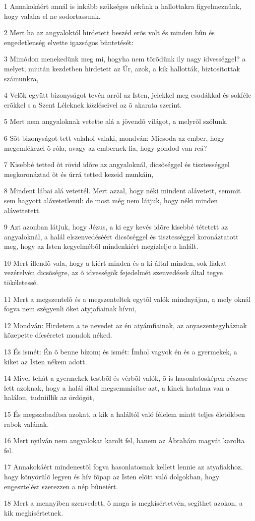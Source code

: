 \par 1 Annakokáért annál is inkább szükséges nékünk a hallottakra figyelmeznünk, hogy valaha el ne sodortassunk.
\par 2 Mert ha az angyaloktól hirdetett beszéd erõs volt és minden bûn és engedetlenség elvette  igazságos büntetését:
\par 3 Mimódon menekedünk meg mi, hogyha nem törõdünk ily nagy idvességgel? a melyet, miután kezdetben hirdetett az Úr, azok, a kik hallották, biztosítottak számunkra,
\par 4 Velök együtt bizonyságot tevén arról az Isten, jelekkel meg csodákkal és sokféle erõkkel s a Szent Léleknek közléseivel  az õ akarata szerint.
\par 5 Mert nem angyaloknak vetette alá a jövendõ világot, a melyrõl szólunk.
\par 6 Sõt bizonyságot tett valahol valaki, mondván: Micsoda az ember, hogy megemlékezel õ róla, avagy az embernek fia, hogy gondod van reá?
\par 7 Kisebbé tetted õt rövid idõre az angyaloknál, dicsõséggel és tisztességgel megkoronáztad õt és úrrá tetted kezeid munkáin,
\par 8 Mindent lábai alá vetettél. Mert azzal, hogy néki mindent alávetett, semmit sem hagyott alávetetlenül: de most még nem látjuk, hogy néki minden alávettetett.
\par 9 Azt azonban látjuk, hogy Jézus, a ki egy kevés idõre kisebbé tétetett az angyaloknál, a halál elszenvedéséért dicsõséggel és tisztességgel koronáztatott meg, hogy az Isten kegyelmébõl mindenkiért megízlelje a  halált.
\par 10 Mert illendõ vala, hogy a kiért minden és a ki által minden, sok fiakat vezérelvén dicsõségre, az õ idvességök fejedelmét szenvedések által tegye tökéletessé.
\par 11 Mert a megszentelõ és a megszenteltek egytõl valók mindnyájan, a mely oknál fogva nem szégyenli õket atyjafiainak hívni,
\par 12 Mondván: Hirdetem a te nevedet az én atyámfiainak, az anyaszentegyháznak közepette dícséretet mondok néked.
\par 13 És ismét: Én õ benne bízom; és ismét:  Ímhol vagyok én és a gyermekek, a kiket az Isten nékem adott.
\par 14 Mivel tehát a gyermekek testbõl és vérbõl valók, õ is hasonlatosképen részese lett azoknak, hogy a  halál által megsemmisítse azt, a kinek hatalma van a halálon, tudniillik az ördögöt,
\par 15 És megszabadítsa azokat, a kik a haláltól való félelem miatt teljes életökben rabok valának.
\par 16 Mert nyilván nem angyalokat karolt fel, hanem az Ábrahám magvát karolta fel.
\par 17 Annakokáért mindenestõl fogva hasonlatosnak kellett lennie az atyafiakhoz, hogy könyörülõ legyen és hív fõpap az Isten elõtt való dolgokban, hogy engesztelést szerezzen a nép bûneiért.
\par 18 Mert a mennyiben szenvedett, õ maga is megkísértetvén, segíthet azokon, a kik megkísértetnek.

